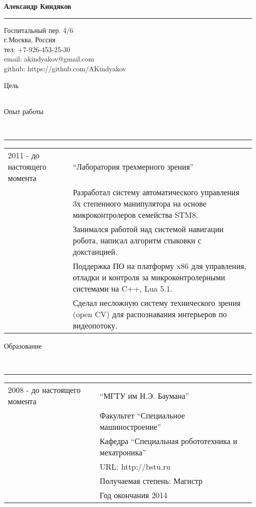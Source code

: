 \documentclass{article}
\begin{document}
{\Large\textbf{Александр Киндяков}}
\hrule \smallskip
\rule{0pt}{5mm}
{\normalsize
\itshape
\begin{flushright}
Госпитальный пер. 4/6 \\
г.Москва, Россия \\
тел: +7-926-453-25-30 \\
email: akindyakov@gmail.com \\
github: https://github.com/AKindyakov \\
\end{flushright}
}

{\large Цель } \rule{0pt}{1cm} \\

{\large Опыт работы } \rule{0pt}{1cm} \\
\hrule \smallskip
    \begin{tabular}{p{25mm}|p{110mm}}
    2011 - до настоящего момента
        & ``Лаборатория трехмерного зрения'' \\
        & Разработал систему автоматического управления 
            3х степенного манипулятора на основе микроконтролеров семейства STM8. \\
        & Занимался работой над системой навигации робота,
            написал алгоритм стыковки с докстанцией. \\
        & Поддержка ПО на платформу x86 для управления, 
            отладки и контроля за микроконтролерными системами на C++, Lua 5.1.  \\
        & Сделал несложную систему технического зрения (open CV) 
            для распознавания интерьеров по видеопотоку.  \\
    \end{tabular}

{\large Образование} \rule{0pt}{1cm} \\
\hrule \smallskip
    \begin{tabular}{p{25mm}|p{110mm}}
    2008 - до настоящего момента 
        & ``МГТУ им Н.Э. Баумана'' \\ 
        & Факультет ``Специальное машиностроение'' \\
        & Кафедра ``Специальная робототехника и мехатроника'' \\
        & URL: http://bstu.ru \\
        & Получаемая степень: Магистр \\
        & Год окончания 2014
    \end{tabular}
\end{document}
